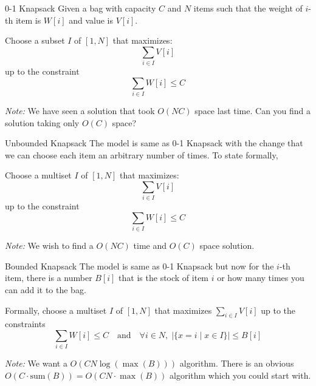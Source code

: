 \documentclass{beamer}
\begin{document}
\begin{frame}{}
\end{frame}
\begin{frame}{}
\end{frame}

\begin{frame}{0-1 Knapsack}
Given a bag with capacity $C$ and $N$ items such that the weight of $i$-th item is $W[i]$ and value is $V[i]$.

\medskip
Choose a subset $I$ of $[1, N]$ that maximizes:
\[
\sum_{i \in I} V[i]
\]
up to the constraint
\[
\sum_{i \in I} W[i] \leq C
\]

\medskip
\textit{Note:} We have seen a solution that took $O(NC)$ space last time. Can you find a solution taking only $O(C)$ space?
\end{frame}

\begin{frame}{}
\end{frame}
\begin{frame}{}
\end{frame}

\begin{frame}{Unbounded Knapsack}
The model is same as 0-1 Knapsack with the change that we can choose each item an arbitrary number of times. To state formally,

\medskip
Choose a multiset $I$ of $[1, N]$ that maximizes:
\[
\sum_{i \in I} V[i]
\]
up to the constraint
\[
\sum_{i \in I} W[i] \leq C
\]

\medskip
\textit{Note:} We wish to find a $O(NC)$ time and $O(C)$ space solution.
\end{frame}

\begin{frame}{}
\end{frame}
\begin{frame}{}
\end{frame}

\begin{frame}{Bounded Knapsack}
The model is same as 0-1 Knapsack but now for the $i$-th item, there is a number $B[i]$ that is the stock of item $i$ or how many times you can add it to the bag.

\medskip
Formally, choose a multiset $I$ of $[1, N]$ that maximizes $\sum_{i \in I} V[i]$ up to the constraints
\[
\sum_{i \in I} W[i] \leq C \quad \text{and} \quad \forall i \in N,\; |\{x = i \mid x \in I\}| \leq B[i]
\]

\medskip
\textit{Note:} We want a $O(CN \log(\max(B)))$ algorithm. There is an obvious $O(C \cdot \text{sum}(B)) = O(CN \cdot \max(B))$ algorithm which you could start with.
\end{frame}
\end{document}

